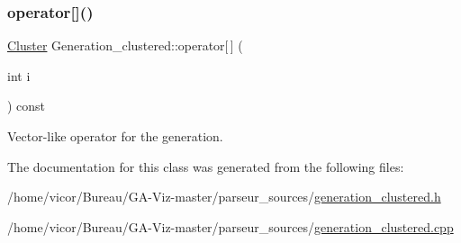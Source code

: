 \mbox{\label{class_generation__clustered_a91d8016a9ce56103000902be5c1acd1c}} 
\subsubsection{\texorpdfstring{operator[]()}{operator[]()}\hspace{0.1cm}{\footnotesize\ttfamily [2/2]}}
{\footnotesize\ttfamily \hyperlink{class_cluster}{Cluster} Generation\+\_\+clustered\+::operator\mbox{[}$\,$\mbox{]} (\begin{DoxyParamCaption}\item[{int}]{i }\end{DoxyParamCaption}) const}



Vector-\/like operator for the generation. 



The documentation for this class was generated from the following files\+:\begin{DoxyCompactItemize}
\item 
/home/vicor/\+Bureau/\+G\+A-\/\+Viz-\/master/parseur\+\_\+sources/\hyperlink{generation__clustered_8h}{generation\+\_\+clustered.\+h}\item 
/home/vicor/\+Bureau/\+G\+A-\/\+Viz-\/master/parseur\+\_\+sources/\hyperlink{generation__clustered_8cpp}{generation\+\_\+clustered.\+cpp}\end{DoxyCompactItemize}
